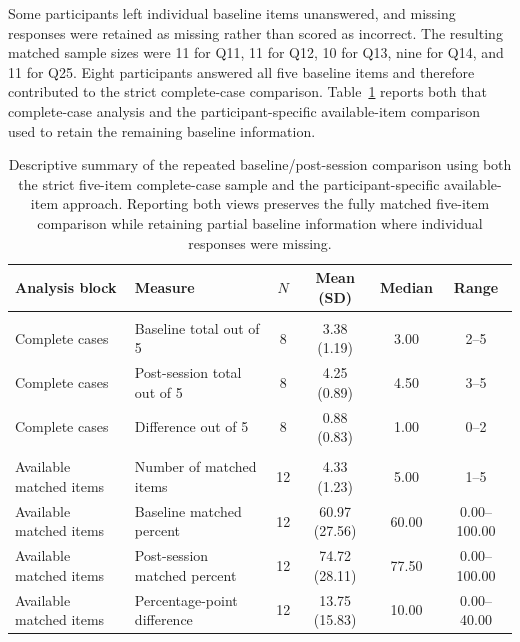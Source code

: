 Some participants left individual baseline items unanswered, and missing responses were retained as missing rather than scored as incorrect. The resulting matched sample sizes were 11 for Q11, 11 for Q12, 10 for Q13, nine for Q14, and 11 for Q25. Eight participants answered all five baseline items and therefore contributed to the strict complete-case comparison. Table~\ref{tab:baseline-post-summary} reports both that complete-case analysis and the participant-specific available-item comparison used to retain the remaining baseline information.

\begin{table}[!htbp]
\centering
\small
\renewcommand{\arraystretch}{1.1}
\begin{tabularx}{\textwidth}{>{\raggedright\arraybackslash}p{3.7cm} >{\raggedright\arraybackslash}X c c c c}
\toprule
Analysis block & Measure & $N$ & Mean (SD) & Median & Range \\
\midrule
\multicolumn{6}{l}{\textit{Strict five-item complete-case comparison}} \\
Complete cases & Baseline total out of 5 & 8 & 3.38 (1.19) & 3.00 & 2--5 \\
Complete cases & Post-session total out of 5 & 8 & 4.25 (0.89) & 4.50 & 3--5 \\
Complete cases & Difference out of 5 & 8 & 0.88 (0.83) & 1.00 & 0--2 \\
\midrule
\multicolumn{6}{l}{\textit{Participant-specific available-item comparison}} \\
Available matched items & Number of matched items & 12 & 4.33 (1.23) & 5.00 & 1--5 \\
Available matched items & Baseline matched percent & 12 & 60.97 (27.56) & 60.00 & 0.00--100.00 \\
Available matched items & Post-session matched percent & 12 & 74.72 (28.11) & 77.50 & 0.00--100.00 \\
Available matched items & Percentage-point difference & 12 & 13.75 (15.83) & 10.00 & 0.00--40.00 \\
\bottomrule
\end{tabularx}
\caption[Baseline/post-session comparison summary]{Descriptive summary of the repeated baseline/post-session comparison using both the strict five-item complete-case sample and the participant-specific available-item approach. Reporting both views preserves the fully matched five-item comparison while retaining partial baseline information where individual responses were missing.}
\label{tab:baseline-post-summary}
\end{table}

